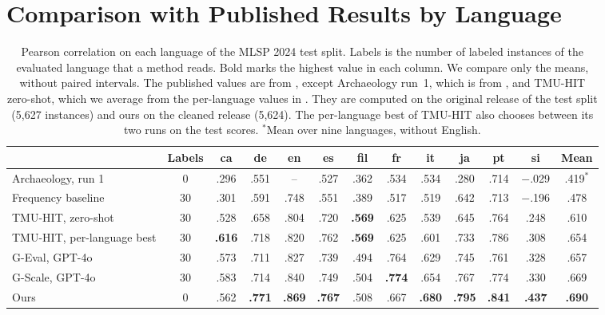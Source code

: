 \documentclass[11pt]{article}
\begin{document}
\begin{table}[t]
\section{Comparison with Published Results by Language}
\label{sec:appendix-published}
\centering
\small
\setlength{\tabcolsep}{4.5pt}
\begin{tabular}{lcccccccccccc}
\toprule
 & Labels & ca & de & en & es & fil & fr & it & ja & pt & si & Mean \\
\midrule
Archaeology, run 1         & 0      & .296 & .551 & --   & .527 & .362 & .534 & .534 & .280 & .714 & $-$.029 & .419$^{*}$ \\ %
\midrule
Frequency baseline         & 30     & .301 & .591 & .748 & .551 & .389 & .517 & .519 & .642 & .713 & $-$.196 & .478 \\
TMU-HIT, zero-shot         & 30     & .528 & .658 & .804 & .720 & \textbf{.569} & .625 & .539 & .645 & .764 & .248 & .610 \\
TMU-HIT, per-language best & 30     & \textbf{.616} & .718 & .820 & .762 & \textbf{.569} & .625 & .601 & .733 & .786 & .308 & .654 \\
G-Eval, GPT-4o             & 30     & .573 & .711 & .827 & .739 & .494 & .764 & .629 & .745 & .761 & .328 & .657 \\
G-Scale, GPT-4o            & 30     & .583 & .714 & .840 & .749 & .504 & \textbf{.774} & .654 & .767 & .774 & .330 & .669 \\
\midrule
Ours                       & 0      & .562 & \textbf{.771} & \textbf{.869} & \textbf{.767} & .508 & .667 & \textbf{.680} & \textbf{.795} & \textbf{.841} & \textbf{.437} & \textbf{.690} \\ %
\bottomrule
\end{tabular}
\caption{Pearson correlation on each language of the MLSP 2024 test split. Labels is the number of
labeled instances of the evaluated language that a method reads. Bold marks the highest value in
each column.
We compare only the means, without paired intervals. The published values
are from \citet{nohejl-etal-2025-japanese}, except Archaeology run~1, which is from
\citet{cristea-nisioi-2024-machine}, and TMU-HIT zero-shot, which we average from the per-language
values in \citet{shardlow-etal-2024-bea}. They are computed on the original release of the test
split (5{,}627 instances) and ours on the cleaned release (5{,}624). The per-language best of TMU-HIT also
chooses between its two runs on the test scores. $^{*}$Mean over nine languages, without English.}
\label{tab:published}
\end{table}
\end{document}
